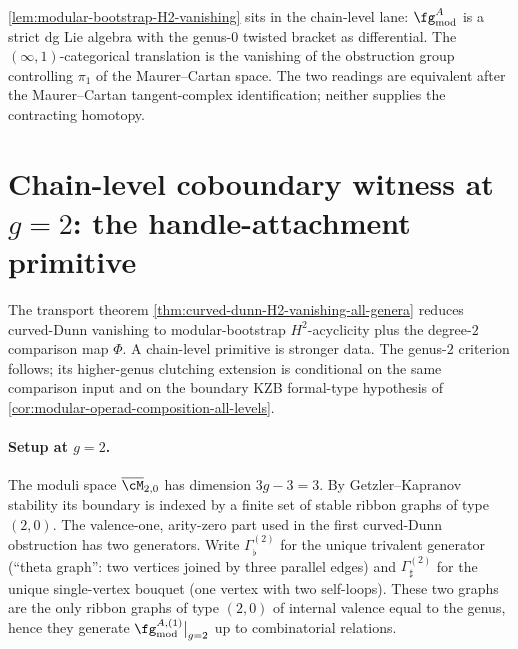 \begin{remark}
\label{rem:lemma-two-lanes}
\autoref{lem:modular-bootstrap-H2-vanishing} sits in the
chain-level lane: \(\fg^{A}_{\mathrm{mod}}\) is a strict dg Lie
algebra with the genus-\(0\) twisted bracket as differential. The
\((\infty,1)\)-categorical translation is the vanishing of the
obstruction group controlling \(\pi_{1}\) of the Maurer--Cartan
space. The two readings are equivalent after the
Maurer--Cartan tangent-complex identification; neither supplies the
contracting homotopy.
\end{remark}

\section{Chain-level coboundary witness at \texorpdfstring{$g = 2$}{g=2}:
the handle-attachment primitive}
\label{sec:chain-level-coboundary-g2}

The transport theorem
\autoref{thm:curved-dunn-H2-vanishing-all-genera} reduces
curved-Dunn vanishing to modular-bootstrap \(H^{2}\)-acyclicity
plus the degree-\(2\) comparison map \(\Phi\). A chain-level
primitive is stronger data. The genus-\(2\) criterion follows;
its higher-genus clutching extension is conditional on the same
comparison input and on the boundary KZB formal-type hypothesis of
\autoref{cor:modular-operad-composition-all-levels}.

\paragraph{Setup at \(g = 2\).}
The moduli space \(\overline{\cM}_{2,0}\) has dimension
\(3g - 3 = 3\). By Getzler--Kapranov stability \cite{GeK98} its
boundary is indexed by a finite set of stable ribbon graphs of type
\((2,0)\). The valence-one, arity-zero part used in the first
curved-Dunn obstruction has two generators. Write
\(\Gamma^{(2)}_{\flat}\) for the unique trivalent generator
(``theta graph'': two vertices joined by three parallel edges)
and \(\Gamma^{(2)}_{\sharp}\) for the unique
single-vertex bouquet (one vertex with two self-loops). These
two graphs are the only ribbon graphs of type \((2, 0)\) of
internal valence equal to the genus, hence they generate
\(\fg^{A,(1)}_{\mathrm{mod}}\big|_{g = 2}\) up to combinatorial
relations.

